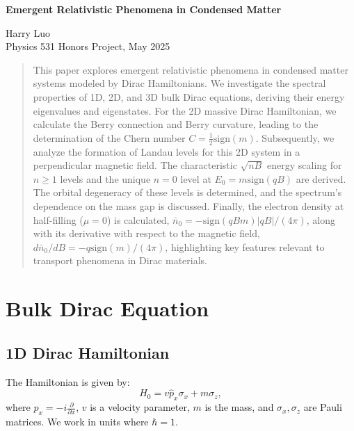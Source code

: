 \documentclass[11pt]{article}
\newcommand{\sgn}{\mathrm{sign}}
\begin{document}
\begin{center}
  \huge\bfseries
  Emergent Relativistic Phenomena in Condensed Matter
\end{center}
\begin{center}
  \normalsize
  Harry Luo\\[0.1ex]
  Physics 531 Honors Project, May 2025
\end{center}


\begin{abstract}
  This paper explores emergent relativistic phenomena in condensed matter systems modeled by Dirac Hamiltonians. We investigate the spectral properties of 1D, 2D, and 3D bulk Dirac equations, deriving their energy eigenvalues and eigenstates. For the 2D massive Dirac Hamiltonian, we calculate the Berry connection and Berry curvature, leading to the determination of the Chern number $C = \frac{1}{2}\sgn(m)$. Subsequently, we analyze the formation of Landau levels for this 2D system in a perpendicular magnetic field. The characteristic $\sqrt{nB}$ energy scaling for $n \ge 1$ levels and the unique $n=0$ level at $E_0 = m \sgn(qB)$ are derived. The orbital degeneracy of these levels is determined, and the spectrum's dependence on the mass gap is discussed. Finally, the electron density at half-filling ($\mu=0$) is calculated, $\bar{n}_0 = -\sgn(qBm) |qB|/(4\pi)$, along with its derivative with respect to the magnetic field, $d\bar{n}_0/dB = -q \sgn(m)/(4\pi)$, highlighting key features relevant to transport phenomena in Dirac materials.
  \end{abstract}
  
  \vspace{0.5cm} %
  


\section{Bulk Dirac Equation}\subsection{1D Dirac Hamiltonian}

The Hamiltonian is given by:
\begin{equation}
H_{0} = v \hat{p}_x \sigma_x + m \sigma_z,
\end{equation}
where $\hat{p}_x = -i \frac{\partial}{\partial x}$, $v$ is a velocity parameter, $m$ is the mass, and $\sigma_x, \sigma_z$ are Pauli matrices. We work in units where $\hbar=1$.
\end{document}
